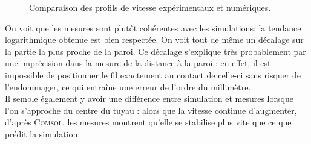 \documentclass[12pt, a4paper]{report}
\begin{document}
\begin{figure}[h!]
\begin{minipage}{0.48\textwidth}
		\end{minipage}
		\caption{Comparaison des profils de vitesse expérimentaux et numériques.}
		\label{couche_limite_comparaison}
	\end{figure}
	
	\noindent On voit que les mesures sont plutôt cohérentes avec les simulations; la tendance logarithmique obtenue est bien respectée. On voit tout de même un décalage sur la partie la plus proche de la paroi. Ce décalage s'explique très probablement par une imprécision dans la mesure de la distance à la paroi : en effet, il est impossible de positionner le fil exactement au contact de celle-ci sans risquer de l'endommager, ce qui entraîne une erreur de l'ordre du millimètre.\\

	\noindent Il semble également y avoir une différence entre simulation et mesures lorsque l'on s'approche du centre du tuyau : alors que la vitesse continue d'augmenter, d'après \textsc{Comsol}, les mesures montrent qu'elle se stabilise plus vite que ce que prédit la simulation. \\
	
\end{document}
